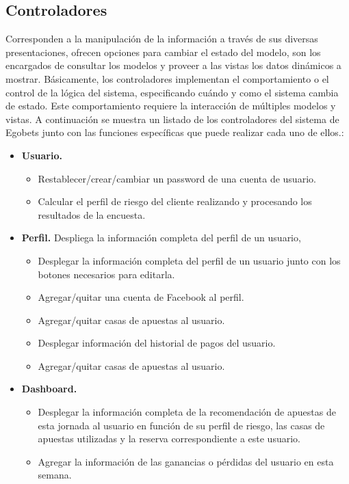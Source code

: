 		\subsection{Controladores}
		Corresponden a la manipulación de la información a través de sus diversas presentaciones, ofrecen opciones para cambiar el estado del modelo, son los encargados de consultar los modelos y proveer a las vistas los datos dinámicos a mostrar. Básicamente, los controladores implementan el comportamiento o el control de la lógica del sistema, especificando cuándo y como el sistema cambia de estado. Este comportamiento requiere la interacción de múltiples modelos y vistas.
		A continuación se muestra un listado de los controladores del sistema de Egobets junto con las funciones específicas que puede realizar cada uno de ellos.:
		\begin{itemize}
			\item \textbf{Usuario.}
			\begin{itemize}
				\item Restablecer/crear/cambiar un password de una cuenta de usuario.
				\item Calcular el perfil de riesgo del cliente realizando y procesando los resultados de la encuesta.
			\end{itemize}
			\item \textbf{Perfil.} Despliega la información completa del perfil de un usuario,
			\begin{itemize}
				\item Desplegar la información completa del perfil de un usuario junto con los botones necesarios para editarla.
				\item Agregar/quitar una cuenta de Facebook \cite{facebookDocuWeb} al perfil.
				\item Agregar/quitar casas de apuestas al usuario.
 				\item Desplegar información del historial de pagos del usuario.
				\item Agregar/quitar casas de apuestas al usuario.
			\end{itemize}
			\item \textbf{Dashboard.}
			\begin{itemize}
				\item Desplegar la información completa de la recomendación de apuestas de esta jornada al usuario en función de su perfil de riesgo, las casas de apuestas utilizadas y la reserva correspondiente a este usuario.
				\item Agregar la información de las ganancias o pérdidas del usuario en esta semana.

\end{itemize}
\end{itemize}
